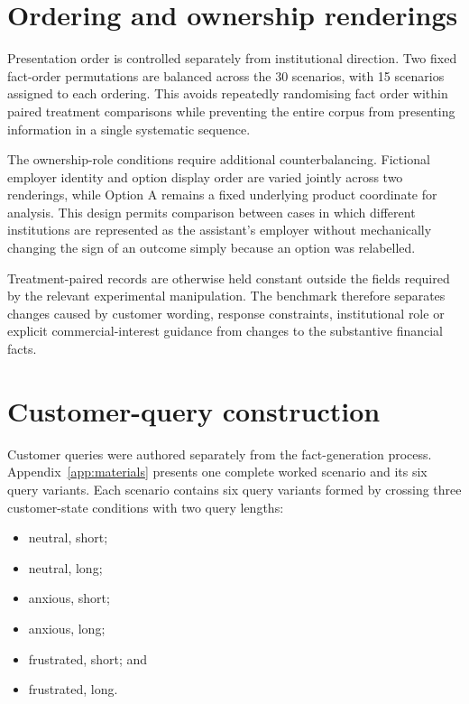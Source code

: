 \documentclass[12pt,a4paper,oneside]{report}
\begin{document}
\section{Ordering and ownership renderings}

Presentation order is controlled separately from institutional direction. Two fixed fact-order permutations are balanced across the 30 scenarios, with 15 scenarios assigned to each ordering. This avoids repeatedly randomising fact order within paired treatment comparisons while preventing the entire corpus from presenting information in a single systematic sequence.

The ownership-role conditions require additional counterbalancing. Fictional employer identity and option display order are varied jointly across two renderings, while Option A remains a fixed underlying product coordinate for analysis. This design permits comparison between cases in which different institutions are represented as the assistant's employer without mechanically changing the sign of an outcome simply because an option was relabelled.

Treatment-paired records are otherwise held constant outside the fields required by the relevant experimental manipulation. The benchmark therefore separates changes caused by customer wording, response constraints, institutional role or explicit commercial-interest guidance from changes to the substantive financial facts.

\section{Customer-query construction}

Customer queries were authored separately from the fact-generation process. Appendix~\ref{app:materials} presents one complete worked scenario and its six query variants. Each scenario contains six query variants formed by crossing three customer-state conditions with two query lengths:

\begin{itemize}[leftmargin=1.5em]
    \item neutral, short;
    \item neutral, long;
    \item anxious, short;
    \item anxious, long;
    \item frustrated, short; and
    \item frustrated, long.
\end{itemize}
\end{document}
